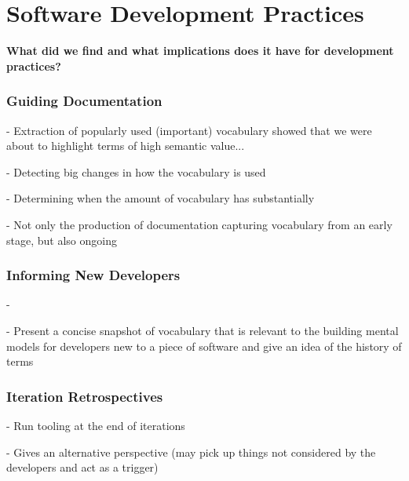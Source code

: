 

\section{Software Development Practices} %
\label{sec:software_development_practices}


\textbf{What did we find and what implications does it have for development practices?}

\subsubsection{Guiding Documentation} %
\label{ssub:guiding_documentation}

- Extraction of popularly used (important) vocabulary showed that we were about to highlight terms of high semantic value... 

- Detecting big changes in how the vocabulary is used

- Determining when the amount of vocabulary has substantially

- Not only the production of documentation capturing vocabulary from an early stage, but also ongoing


\subsubsection{Informing New Developers} %
\label{ssub:informing_new_developers}

- 

- Present a concise snapshot of vocabulary that is relevant to the building mental models for developers new to a piece of software and give an idea of the history of terms


\subsubsection{Iteration Retrospectives} %
\label{ssub:iteration_retrospectives}

- Run tooling at the end of iterations

- Gives an alternative perspective (may pick up things not considered by the developers and act as a trigger)



